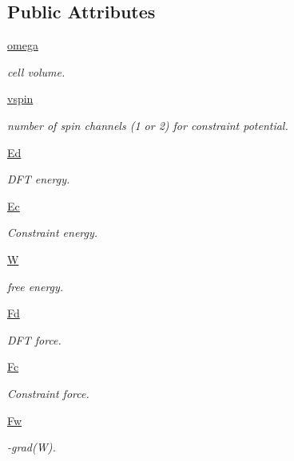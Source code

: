 \subsection*{Public Attributes}
\begin{DoxyCompactItemize}
\item 
\hyperlink{classpycdft_1_1common_1_1sample_1_1Sample_a49b2c758ad8f4cc0e5b30467c97fd863}{omega}
\begin{DoxyCompactList}\small\item\em cell volume. \end{DoxyCompactList}\item 
\hyperlink{classpycdft_1_1common_1_1sample_1_1Sample_a3fafb9053c6b3a3a99aca6ec6d74b0ef}{vspin}
\begin{DoxyCompactList}\small\item\em number of spin channels (1 or 2) for constraint potential. \end{DoxyCompactList}\item 
\hyperlink{classpycdft_1_1common_1_1sample_1_1Sample_a7c57a72c49ebae1ee29cc4200ab11759}{Ed}
\begin{DoxyCompactList}\small\item\em D\-F\-T energy. \end{DoxyCompactList}\item 
\hyperlink{classpycdft_1_1common_1_1sample_1_1Sample_aa4a7efe5a09f8aac67002c7b095c402e}{Ec}
\begin{DoxyCompactList}\small\item\em Constraint energy. \end{DoxyCompactList}\item 
\hyperlink{classpycdft_1_1common_1_1sample_1_1Sample_a54c37016030864effcd67f63f38b8387}{W}
\begin{DoxyCompactList}\small\item\em free energy. \end{DoxyCompactList}\item 
\hyperlink{classpycdft_1_1common_1_1sample_1_1Sample_a5dba3318898997d2255410be439f21a3}{Fd}
\begin{DoxyCompactList}\small\item\em D\-F\-T force. \end{DoxyCompactList}\item 
\hyperlink{classpycdft_1_1common_1_1sample_1_1Sample_aa56b18544b43f113beaa5ecc028f336a}{Fc}
\begin{DoxyCompactList}\small\item\em Constraint force. \end{DoxyCompactList}\item 
\hyperlink{classpycdft_1_1common_1_1sample_1_1Sample_ab27c15d83155fe029005efaa0de49951}{Fw}
\begin{DoxyCompactList}\small\item\em -\/grad(W). \end{DoxyCompactList}\end{DoxyCompactItemize}


